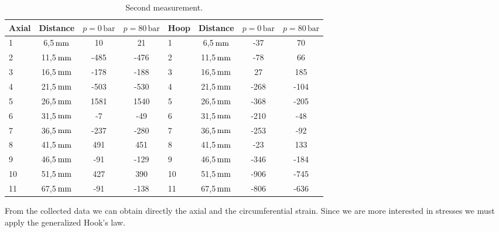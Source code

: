 \documentclass[a4paper,12pt]{article}
\begin{document}
\begin{table}[H]
\centering
\begin{tabular}{lccc|lccc}
Axial & Distance  & $p = 0\,\text{bar}$ & $p = 80\,\text{bar}$ & Hoop & Distance  & $p = 0\,\text{bar}$ & $p = 80\,\text{bar}$ \\ \midrule
1     & 6,5$\,\text{mm}$  & 10                  & 21                   & 1    & 6,5$\,\text{mm}$  & -37                 & 70                   \\ 
2     & 11,5$\,\text{mm}$ & -485                & -476                 & 2    & 11,5$\,\text{mm}$ & -78                 & 66                   \\
3     & 16,5$\,\text{mm}$ & -178                & -188                 & 3    & 16,5$\,\text{mm}$ & 27                  & 185                  \\
4     & 21,5$\,\text{mm}$ & -503                & -530                 & 4    & 21,5$\,\text{mm}$ & -268                & -104                 \\
5     & 26,5$\,\text{mm}$ & 1581                & 1540                 & 5    & 26,5$\,\text{mm}$ & -368                & -205                 \\
6     & 31,5$\,\text{mm}$ & -7                  & -49                  & 6    & 31,5$\,\text{mm}$ & -210                & -48                  \\
7     & 36,5$\,\text{mm}$ & -237                & -280                 & 7    & 36,5$\,\text{mm}$ & -253                & -92                  \\
8     & 41,5$\,\text{mm}$ & 491                 & 451                  & 8    & 41,5$\,\text{mm}$ & -23                 & 133                  \\
9     & 46,5$\,\text{mm}$ & -91                 & -129                 & 9    & 46,5$\,\text{mm}$ & -346                & -184                 \\
10    & 51,5$\,\text{mm}$ & 427                 & 390                  & 10   & 51,5$\,\text{mm}$ & -906                & -745                 \\
11    & 67,5$\,\text{mm}$ & -91                 & -138                 & 11   & 67,5$\,\text{mm}$ & -806                & -636                 \\ \bottomrule
\end{tabular}
\caption{Second measurement.}
\label{table:measurement2}
\end{table}

From the collected data we can obtain directly the axial and the circumferential strain. Since we are more interested in stresses we must apply the generalized Hook's law.
\end{document}
